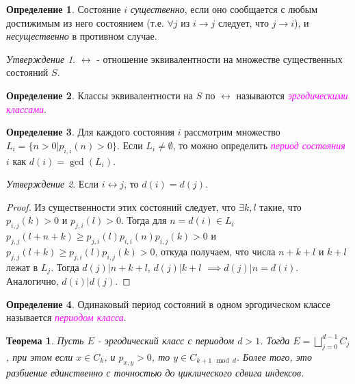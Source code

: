 \documentclass[a4paper,100pt]{article}
\theoremstyle{indented}
\newtheorem{theorem}{Теорема}
\theoremstyle{definition}
\newtheorem{defn}{Определение}
\theoremstyle{remark}
\newtheorem{stat}{Утверждение}
\begin{document}
\begin{defn}
  Состояние $i$ \textit{существенно}, если оно сообщается с любым достижимым из него состоянием (т.е. $\forall j$ из $i \rightarrow j$ следует, что $j \rightarrow i$), и \textit{несущественно} в противном случае.
\end{defn}

\begin{stat}
  $\leftrightarrow$ - отношение эквивалентности на множестве существенных состояний $S$.
\end{stat}

\begin{defn}
  Классы эквивалентности на $S$ по $\leftrightarrow$ называются \hypertarget{n38}{\textcolor{magenta}{\textit{эргодическими классами}}}.
\end{defn}

\begin{defn}
  Для каждого состояния $i$ рассмотрим множество $L_i=\{n>0 | p_{i, i}(n)>0\}$. Если $L_i \neq \emptyset$, то можно определить \hypertarget{n39}{\textcolor{magenta}{\textit{период состояния}}} $i$ как $d(i)=\gcd(L_i)$.
\end{defn}

\begin{stat}
  Если $i \leftrightarrow j$, то $d(i)=d(j)$.
\end{stat}

\begin{proof}
  Из существенности этих состояний следует, что $\exists k, l$ такие, что $p_{i, j}(k)>0$ и $p_{j, i}(l)>0$. Тогда для $n=d(i) \in L_i $ $p_{j, j}(l+n+k) \geq p_{j, i}(l)p_{i, i}(n)p_{i, j}(k)>0$ и $p_{j, j}(l+k) \geq p_{j, i}(l)p_{i, j}(k)>0$, откуда получаем, что числа $n+k+l$ и $k+l$ лежат в $L_j$. Тогда $d(j) | n+k+l$, $d(j) | k+l$ $\implies d(j) | n=d(i)$. Аналогично, $d(i) | d(j)$.
\end{proof}

\begin{defn}
  Одинаковый период состояний в одном эргодическом классе называется \hypertarget{n40}{\textcolor{magenta}{\textit{периодом класса}}}.
\end{defn}

\begin{theorem}
  Пусть $E$ - эргодический класс с периодом $d>1$. Тогда $E=\bigsqcup_{j=0}^{d-1} C_j$, при этом если $x \in C_k$, и $p_{x, y}>0$, то $y \in C_{k+1 \mod d}$. Более того, это разбиение единственно с точностью до циклического сдвига индексов.
\end{theorem}
\end{document}
